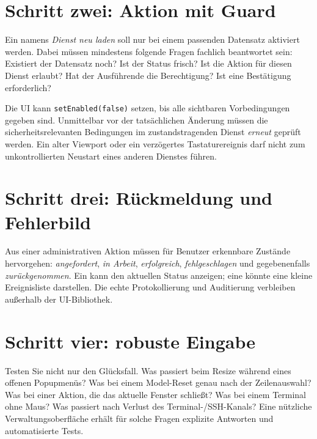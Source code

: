 \section{Schritt zwei: Aktion mit Guard}
Ein  namens
\emph{Dienst neu laden} soll nur bei
einem passenden Datensatz aktiviert werden.
Dabei müssen mindestens folgende
Fragen fachlich beantwortet sein:
Existiert der Datensatz noch?
Ist der Status frisch?
Ist die Aktion für diesen Dienst erlaubt?
Hat der Ausführende die Berechtigung?
Ist eine Bestätigung erforderlich?

Die UI kann \texttt{setEnabled(false)}
setzen, bis alle sichtbaren Vorbedingungen
gegeben sind. Unmittelbar vor der
tatsächlichen Änderung müssen die
sicherheitsrelevanten Bedingungen im
zustandstragenden Dienst \emph{erneut}
geprüft werden. Ein alter Viewport
oder ein verzögertes Tastaturereignis
darf nicht zum unkontrollierten
Neustart eines anderen Dienstes führen.

\section{Schritt drei: Rückmeldung und Fehlerbild}
Aus einer administrativen Aktion
müssen für Benutzer erkennbare
Zustände hervorgehen: \emph{angefordert},
\emph{in Arbeit}, \emph{erfolgreich},
\emph{fehlgeschlagen} und gegebenenfalls
\emph{zurückgenommen}.
Ein  kann den aktuellen
Status anzeigen; eine
 könnte eine
kleine Ereignisliste darstellen.
Die echte Protokollierung und
Auditierung verbleiben außerhalb
der UI-Bibliothek.

\section{Schritt vier: robuste Eingabe}
Testen Sie nicht nur den Glücksfall.
Was passiert beim Resize während
eines offenen Popupmenüs?
Was bei einem Model-Reset genau nach
der Zeilenauswahl?
Was bei einer Aktion, die das aktuelle
Fenster schließt?
Was bei einem Terminal ohne Maus?
Was passiert nach Verlust des
Terminal-/SSH-Kanals?
Eine nützliche Verwaltungsoberfläche
erhält für solche Fragen explizite
Antworten und automatisierte Tests.

